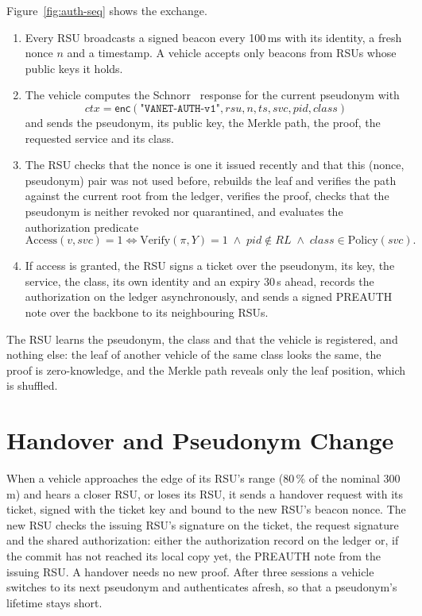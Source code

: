 Figure~\ref{fig:auth-seq} shows the exchange.
\begin{enumerate}
  \item Every RSU broadcasts a signed beacon every 100\,ms with its identity, a fresh nonce $n$ and a
  timestamp. A vehicle accepts only beacons from RSUs whose public keys it holds.
  \item The vehicle computes the Schnorr~\cite{schnorr1991} response for the current pseudonym with
  \[\mathit{ctx} = \mathsf{enc}(\texttt{"VANET-AUTH-v1"}, \mathit{rsu}, n, ts, \mathit{svc}, \mathit{pid}, \mathit{class})\]
  and sends the pseudonym, its public key, the Merkle path, the proof, the requested service and its
  class.
  \item The RSU checks that the nonce is one it issued recently and that this (nonce, pseudonym) pair
  was not used before, rebuilds the leaf and verifies the path against the current root from the
  ledger, verifies the proof, checks that the pseudonym is neither revoked nor quarantined, and
  evaluates the authorization predicate
  \begin{equation}\label{eq:access}
    \mathrm{Access}(v, \mathit{svc}) = 1 \iff \mathrm{Verify}(\pi, Y) = 1 \;\wedge\; \mathit{pid} \notin \mathit{RL}
      \;\wedge\; \mathit{class} \in \mathrm{Policy}(\mathit{svc}).
  \end{equation}
  \item If access is granted, the RSU signs a ticket over the pseudonym, its key, the service, the
  class, its own identity and an expiry 30\,s ahead, records the authorization on the ledger
  asynchronously, and sends a signed PREAUTH note over the backbone to its neighbouring RSUs.
\end{enumerate}
The RSU learns the pseudonym, the class and that the vehicle is registered, and nothing else: the
leaf of another vehicle of the same class looks the same, the proof is zero-knowledge, and the
Merkle path reveals only the leaf position, which is shuffled.

\section{Handover and Pseudonym Change}

When a vehicle approaches the edge of its RSU's range (80\,\% of the nominal 300\,m) and hears a
closer RSU, or loses its RSU, it sends a handover request with its ticket, signed with the ticket key
and bound to the new RSU's beacon nonce. The new RSU checks the issuing RSU's signature on the ticket,
the request signature and the shared authorization: either the authorization record on the ledger or,
if the commit has not reached its local copy yet, the PREAUTH note from the issuing RSU. A handover
needs no new proof. After three sessions a vehicle switches to its next pseudonym and authenticates
afresh, so that a pseudonym's lifetime stays short.

